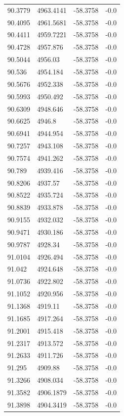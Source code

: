 \begin{table}[H]
\begin{tabular}{llll}
90.3779 & 4963.4141 & -58.3758 & -0.0 \\
90.4095 & 4961.5681 & -58.3758 & -0.0 \\
90.4411 & 4959.7221 & -58.3758 & -0.0 \\
90.4728 & 4957.876 & -58.3758 & -0.0 \\
90.5044 & 4956.03 & -58.3758 & -0.0 \\
90.536 & 4954.184 & -58.3758 & -0.0 \\
90.5676 & 4952.338 & -58.3758 & -0.0 \\
90.5993 & 4950.492 & -58.3758 & -0.0 \\
90.6309 & 4948.646 & -58.3758 & -0.0 \\
90.6625 & 4946.8 & -58.3758 & -0.0 \\
90.6941 & 4944.954 & -58.3758 & -0.0 \\
90.7257 & 4943.108 & -58.3758 & -0.0 \\
90.7574 & 4941.262 & -58.3758 & -0.0 \\
90.789 & 4939.416 & -58.3758 & -0.0 \\
90.8206 & 4937.57 & -58.3758 & -0.0 \\
90.8522 & 4935.724 & -58.3758 & -0.0 \\
90.8839 & 4933.878 & -58.3758 & -0.0 \\
90.9155 & 4932.032 & -58.3758 & -0.0 \\
90.9471 & 4930.186 & -58.3758 & -0.0 \\
90.9787 & 4928.34 & -58.3758 & -0.0 \\
91.0104 & 4926.494 & -58.3758 & -0.0 \\
91.042 & 4924.648 & -58.3758 & -0.0 \\
91.0736 & 4922.802 & -58.3758 & -0.0 \\
91.1052 & 4920.956 & -58.3758 & -0.0 \\
91.1368 & 4919.11 & -58.3758 & -0.0 \\
91.1685 & 4917.264 & -58.3758 & -0.0 \\
91.2001 & 4915.418 & -58.3758 & -0.0 \\
91.2317 & 4913.572 & -58.3758 & -0.0 \\
91.2633 & 4911.726 & -58.3758 & -0.0 \\
91.295 & 4909.88 & -58.3758 & -0.0 \\
91.3266 & 4908.034 & -58.3758 & -0.0 \\
91.3582 & 4906.1879 & -58.3758 & -0.0 \\
91.3898 & 4904.3419 & -58.3758 & -0.0 \\

\end{tabular}
\end{table}
